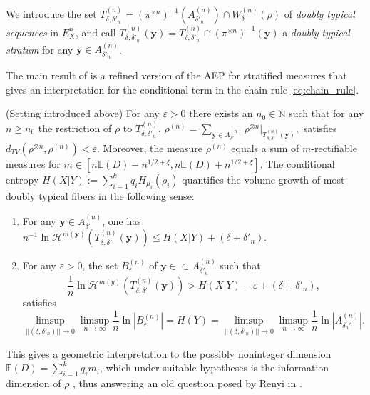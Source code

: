 \documentclass[runningheads]{llncs}
\renewcommand{\epsilon}{\varepsilon}
\newcommand{\Nn}{\mathbb{N}}
\newcommand{\ent}[1]{H_{#1}}
\newcommand{\V}[1]{\mathbf{#1}}
\begin{document}
We introduce the set  $T^{(n)}_{\delta,\delta'_n}=(\pi^{\times n})^{-1}(A_{\delta'_n}^{(n)})\cap W_{\delta}^{(n)}(\rho)$ of   \emph{doubly  typical sequences} in $E_X^n$, and call $T^{(n)}_{\delta,\delta'_n}(\V y) = T^{(n)}_{\delta,\delta'_n}\cap (\pi^{\times n})^{-1}(\V y)$ a \emph{doubly typical stratum} for any $\V y\in A_{\delta'_n}^{(n)}$. 

The main result of \cite{Vigneaux-stratified} is a refined version of the AEP for stratified measures that gives an  interpretation for the conditional term in the chain rule \eqref{eq:chain_rule}. 

\begin{theorem}
(Setting introduced above) For any $\epsilon > 0$ there exists an $n_0\in \Nn$ such that for any $n\geq n_0$ the restriction  of $\rho$ to $T^{(n)}_{\delta,\delta'_n}$, 
 $\rho^{(n)}=\sum_{ \V y \in A_{\delta'}^{(n)}} \rho^{\otimes n}|_{T^{(n)}_{\delta,\delta'}(\V y)},$ satisfies $d_{TV}(\rho^{\otimes n},\rho^{(n)})<\epsilon$.
  Moreover, the measure $\rho^{(n)}$ equals a sum of $m$-rectifiable measures for $m\in [n \mathbb E(D) - n^{1/2+\xi}, n\mathbb E(D) + n^{1/2+\xi}]$. The conditional entropy $H(X|Y):=\sum_{i=1}^k q_i \ent{\mu_i}(\rho_i)$ quantifies the volume growth of most doubly typical fibers in the following sense: 
 \begin{enumerate}
 \item   For any $\V y \in A_{\delta'}^{(n)}$, one has
 $n^{-1} \ln \mathcal H^{m(\V y)}(T^{(n)}_{\delta,\delta'}(\V y)) \leq H(X|Y) + (\delta + \delta'_n).$
 \item For any $\epsilon > 0$, the set $B_{\epsilon}^{(n)}$  of $\V y\in \subset A_{\delta'_n}^{(n)}$ such that 
 $$\frac{1}{n} \ln \mathcal H^{m(y)}(T^{(n)}_{\delta,\delta'}(\V y)) > H(X|Y) -\epsilon + (\delta + \delta'_n),$$
 satisfies 
 $$\limsup_{||(\delta,\delta'_n)||\to 0}\limsup_{n\to \infty} \frac{1}{n} \ln |B^{(n)}_\epsilon| = H(Y)= \limsup_{||(\delta,\delta'_n)||\to 0}\limsup_{n\to \infty} \frac{1}{n} \ln |A^{(n)}_{\delta_n'}|.$$
 \end{enumerate}
\end{theorem}
This gives a geometric interpretation to the possibly noninteger dimension $\mathbb E(D) = \sum_{i=1}^k q_i m_i$, which under suitable hypotheses is the information dimension of $\rho$ \cite[Sec. V]{Vigneaux-stratified}, thus answering an old question posed by Renyi in \cite[p. 209]{Renyi1959}.
\end{document}

